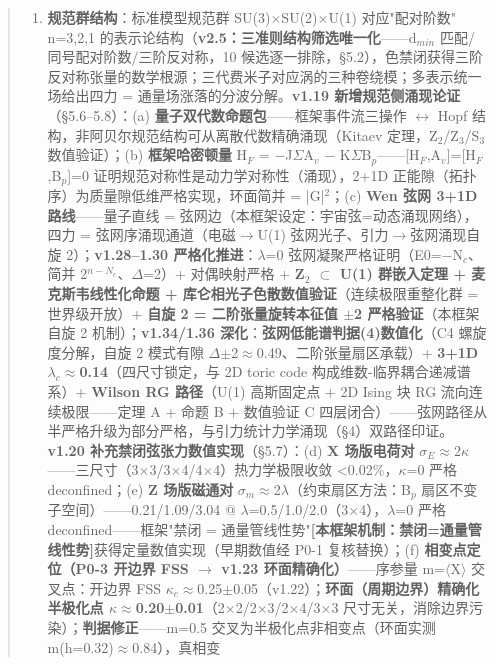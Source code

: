 \documentclass[12pt]{article}
\newcommand{\mtag}[1]{\textbf{[#1]}}
\newcommand{\up}[1]{\ensuremath{^{#1}}}
\newcommand{\down}[1]{\ensuremath{_{#1}}}
\begin{document}
\begin{abstract}
\begin{enumerate}
\item \textbf{规范群结构}：标准模型规范群 SU(3)\ensuremath{\times}SU(2)\ensuremath{\times}U(1) 对应"配对阶数" n=3,2,1 的表示论结构（\textbf{v2.5：三准则结构筛选唯一化}------d\down{min} 匹配/同号配对阶数/三阶反对称，10 候选逐一排除，\S{}5.2），色禁闭获得三阶反对称张量的数学根源；三代费米子对应涡的三种卷绕模；多表示统一场给出四力 = 通量场涨落的分波分解。\textbf{v1.19 新增规范侧涌现论证}（\S{}5.6--5.8）：(a) \textbf{量子双代数命题包}------框架事件流三操作 \ensuremath{\leftrightarrow} Hopf 结构，非阿贝尔规范结构可从离散代数精确涌现（Kitaev 定理，Z\down{2}/Z\down{3}/S\down{3} 数值验证）；(b) \textbf{框架哈密顿量} H\down{F} = \ensuremath{-}J\ensuremath{\Sigma}A\down{v} \ensuremath{-} K\ensuremath{\Sigma}B\down{p}------[H\down{F},A\down{v}]=[H\down{F},B\down{p}]=0 证明规范对称性是动力学对称性（涌现），2+1D 正能隙（拓扑序）为质量隙低维严格实现，环面简并 = |G|\up{2}；(c) \textbf{Wen 弦网 3+1D 路线}------量子直线 = 弦网边（本框架设定：宇宙弦=动态涌现网络），四力 = 弦网序涌现通道（电磁\ensuremath{\to}U(1) 弦网光子、引力\ensuremath{\to}弦网涌现自旋 2）；\textbf{v1.28--1.30 严格化推进}：\ensuremath{\lambda}=0 弦网凝聚严格证明（E0=\ensuremath{-}N\down{c}、简并 2\up{n-N\down{c}}、\ensuremath{\Delta}=2）+ 对偶映射严格 + \textbf{Z\down{2} \ensuremath{\subset} U(1) 群嵌入定理 + 麦克斯韦线性化命题 + 库仑相光子色散数值验证}（连续极限重整化群 = 世界级开放）+ \textbf{自旋 2 = 二阶张量旋转本征值 \ensuremath{\pm}2 严格验证}（本框架自旋 2 机制）；\textbf{v1.34/1.36 深化}：\textbf{弦网低能谱判据(4)数值化}（C4 螺旋度分解，自旋 2 模式有隙 \ensuremath{\Delta}\ensuremath{\pm}2\ensuremath{\approx}0.49、二阶张量扇区承载）+ \textbf{3+1D \ensuremath{\lambda}\down{c}\ensuremath{\approx}0.14}（四尺寸锁定，与 2D toric code 构成维数-临界耦合递减谱系）+ \textbf{Wilson RG 路径}（U(1) 高斯固定点 + 2D Ising 块 RG 流向连续极限------定理 A + 命题 B + 数值验证 C 四层闭合）------弦网路径从半严格升级为部分严格，与引力统计力学涌现（\S{}4）双路径印证。\textbf{v1.20 补充禁闭弦张力数值实现}（\S{}5.7）：(d) \textbf{X 场版电荷对} \ensuremath{\sigma}\down{E}\ensuremath{\approx}2\ensuremath{\kappa}------三尺寸（3\ensuremath{\times}3/3\ensuremath{\times}4/4\ensuremath{\times}4）热力学极限收敛 <0.02\%，\ensuremath{\kappa}=0 严格 deconfined；(e) \textbf{Z 场版磁通对} \ensuremath{\sigma}\down{m}\ensuremath{\approx}2\ensuremath{\lambda}（约束扇区方法：B\down{p} 扇区不变子空间）------0.21/1.09/3.04 @ \ensuremath{\lambda}=0.5/1.0/2.0（3\ensuremath{\times}4），\ensuremath{\lambda}=0 严格 deconfined------框架"禁闭 = 通量管线性势"\mtag{本框架机制：禁闭=通量管线性势}获得定量数值实现（早期数值经 P0-1 复核替换）；(f) \textbf{相变点定位（P0-3 开边界 FSS \ensuremath{\to} v1.23 环面精确化）}------序参量 m=\ensuremath{\langle}X\ensuremath{\rangle} 交叉点：开边界 FSS \ensuremath{\kappa}\down{c}\ensuremath{\approx}0.25\ensuremath{\pm}0.05（v1.22）；\textbf{环面（周期边界）精确化半极化点 \ensuremath{\kappa}\*\ensuremath{\approx}0.20\ensuremath{\pm}0.01}（2\ensuremath{\times}2/2\ensuremath{\times}3/2\ensuremath{\times}4/3\ensuremath{\times}3 尺寸无关，消除边界污染）；\textbf{判据修正}------m=0.5 交叉为半极化点非相变点（环面实测 m(h=0.32)\ensuremath{\approx}0.84），真相变 
\end{enumerate}
\end{abstract}
\end{document}

